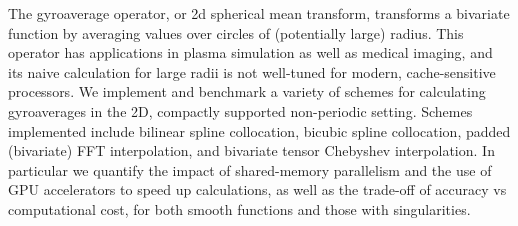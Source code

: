 %

The gyroaverage operator, or 2d spherical mean transform, transforms a bivariate function by averaging values over circles of (potentially large) radius.  This operator has applications in plasma simulation as well as medical imaging, and its naive calculation for large radii is not well-tuned for modern, cache-sensitive processors.  We implement and benchmark a variety of schemes for calculating gyroaverages in the 2D, compactly supported non-periodic setting. Schemes implemented include bilinear spline collocation, bicubic spline collocation, padded (bivariate) FFT interpolation, and bivariate tensor Chebyshev interpolation. In particular we quantify the impact of shared-memory parallelism and the use of GPU accelerators to speed up calculations, as well as the trade-off of accuracy vs computational cost, for both smooth functions and those with singularities.